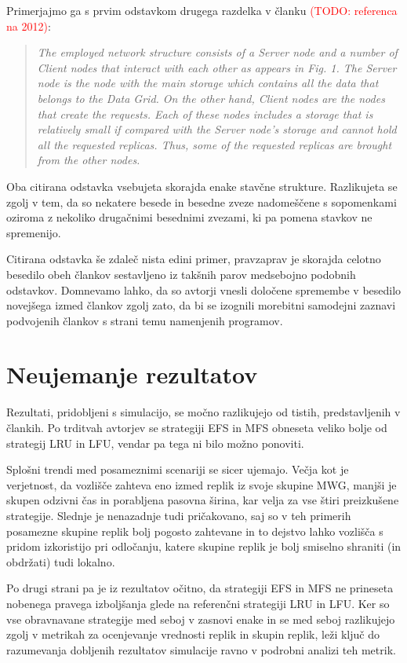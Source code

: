 \documentclass[a4paper, 12pt]{book}
\newcommand{\TODO}[1]{\textcolor{red}{(TODO: #1)}}
\newenvironment{itquote}
{\begin{quote}\itshape}
{\end{quote}}
\begin{document}
Primerjajmo ga s prvim odstavkom drugega razdelka v članku
\TODO{referenca na 2012}:

\begin{itquote}
The employed network structure consists of a Server node and a number of
Client nodes that interact with each other as appears in Fig. 1. The Server
node is the node with the main storage which contains all the data that
belongs to the Data Grid. On the other hand, Client nodes are the nodes that
create the requests. Each of these nodes includes a storage that is relatively
small if compared with the Server node’s storage and cannot hold all the
requested replicas. Thus, some of the requested replicas are brought from the
other nodes.
\end{itquote}

Oba citirana odstavka vsebujeta skorajda enake stavčne strukture. Razlikujeta
se zgolj v tem, da so nekatere besede in besedne zveze nadomeščene s
sopomenkami oziroma z nekoliko drugačnimi besednimi zvezami, ki pa pomena
stavkov ne spremenijo.

Citirana odstavka še zdaleč nista edini primer, pravzaprav je skorajda
celotno besedilo obeh člankov sestavljeno iz takšnih parov medsebojno podobnih
odstavkov. Domnevamo lahko, da so avtorji vnesli določene spremembe v besedilo
novejšega izmed člankov zgolj zato, da bi se izognili morebitni samodejni
zaznavi podvojenih člankov s strani temu namenjenih programov.

\section{Neujemanje rezultatov}

Rezultati, pridobljeni s simulacijo, se močno razlikujejo od tistih,
predstavljenih v člankih. Po trditvah avtorjev se strategiji EFS in MFS
obneseta veliko bolje od strategij LRU in LFU, vendar pa tega ni bilo možno
ponoviti.

Splošni trendi med posameznimi scenariji se sicer ujemajo. Večja kot je
verjetnost, da vozlišče zahteva eno izmed replik iz svoje skupine MWG, manjši
je skupen odzivni čas in porabljena pasovna širina, kar velja za vse štiri
preizkušene strategije. Slednje je nenazadnje tudi pričakovano, saj so v teh
primerih posamezne skupine replik bolj pogosto zahtevane in to dejstvo lahko
vozlišča s pridom izkoristijo pri odločanju, katere skupine replik je bolj
smiselno shraniti (in obdržati) tudi lokalno.

Po drugi strani pa je iz rezultatov očitno, da strategiji EFS in MFS ne
prineseta nobenega pravega izboljšanja glede na referenčni strategiji LRU in
LFU. Ker so vse obravnavane strategije med seboj v zasnovi enake in se med
seboj razlikujejo zgolj v metrikah za ocenjevanje vrednosti replik in skupin
replik, leži ključ do razumevanja dobljenih rezultatov simulacije ravno v
podrobni analizi teh metrik.
\end{document}
